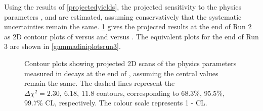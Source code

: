 
Using the results of \tab\ref{projectedyields}, the projected sensitivity to the physics parameters \rb, \deltab and \Pgamma are estimated, assuming conservatively that the systematic uncertainties remain the same. \Fig\ref{gammadiniplotsrun2} gives the projected results at the end of Run 2 as 2D contour plots of \rb versus \Pgamma and \deltab versus \Pgamma. The equivalent plots for the end of Run 3 are shown in \fig\ref{gammadiniplotsrun3}. 

\begin{figure}[h]
\centering
{}
\caption{Contour plots showing projected 2D scans of the physics parameters measured in \btodkst decays at the end of \runtwo, assuming the central values remain the same. The dashed lines represent the $\Delta \chi^2 = 2.30,\ 6.18,\ 11.8$ contours, corresponding to 68.3\%, 95.5\%, 99.7\% CL, respectively. The colour scale represents 1 - CL.}
\label{gammadiniplotsrun2}
\end{figure}

